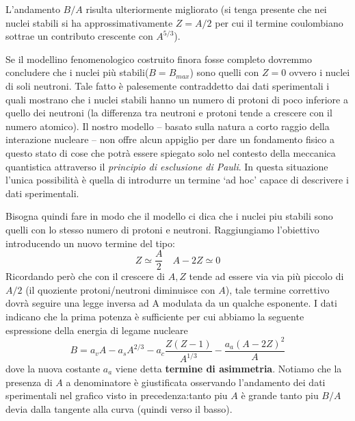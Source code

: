 L'andamento $B / A$ risulta ulteriormente migliorato (si tenga presente
che nei nuclei stabili si ha approssimativamente \(Z=A/2\) per cui il
termine coulombiano sottrae un contributo crescente con \(A^{5/3}\)).

Se il modellino fenomenologico costruito finora fosse completo dovremmo
concludere che i nuclei più stabili(\(B= B_{max}\)) sono quelli con
\(Z=0\) ovvero i nuclei di soli neutroni.
Tale fatto è palesemente
contraddetto dai dati sperimentali i quali mostrano che i nuclei stabili
hanno un numero di protoni di poco inferiore a quello dei neutroni (la
differenza tra neutroni e protoni tende a crescere con il numero
atomico).
Il nostro modello -- basato sulla natura a corto raggio della
interazione nucleare -- non offre alcun appiglio per dare un fondamento
fisico a questo stato di cose che potrà essere spiegato solo nel
contesto della meccanica quantistica attraverso il \emph{principio di
	esclusione di Pauli}.
In questa situazione l'unica possibilità è quella
di introdurre un termine `ad hoc' capace di descrivere i dati
sperimentali.

Bisogna quindi fare in modo che il modello ci dica che i nuclei piu
stabili sono quelli con lo stesso numero di protoni e neutroni.
Raggiungiamo l'obiettivo introducendo un nuovo termine del tipo:
\[
	Z \simeq \frac{A}{2} \quad A - 2Z \simeq 0
\]
Ricordando però che con il crescere di \(A, Z\) tende ad essere via
via più piccolo di \(A/2\) (il quoziente protoni/neutroni diminuisce con
\(A\)), tale termine correttivo dovrà seguire una legge inversa ad A
modulata da un qualche esponente.
I dati indicano che la prima potenza è
sufficiente per cui abbiamo la seguente espressione della energia di
legame nucleare
\[
	B = a_{v}A - a_{s}A^{2/3} - a_{c} \frac{Z(Z-1)}{A^{1/3}} - \frac{a_{a}(A-2Z)^{2}}{A}
\]
dove la nuova costante \(a_{a}\) viene detta \textbf{termine di asimmetria}.
Notiamo che la presenza di \(A\) a denominatore è
giustificata osservando l'andamento dei dati sperimentali nel grafico
visto in precedenza:tanto piu \(A\) è grande tanto piu \(B / A\) devia
dalla tangente alla curva (quindi verso il basso).

